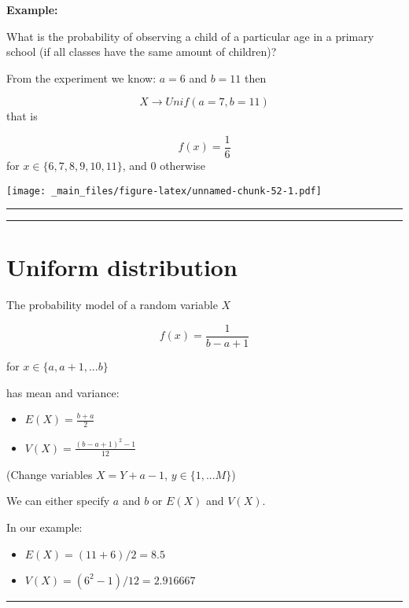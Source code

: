 \documentclass[
]{book}
\providecommand{\tightlist}{%
  \setlength{\itemsep}{0pt}\setlength{\parskip}{0pt}}
\begin{document}
\textbf{Example:}

What is the probability of observing a child of a particular age in a primary school (if all classes have the same amount of children)?

From the experiment we know: \(a=6\) and \(b=11\) then

\[X \rightarrow Unif(a=7, b=11)\] that is

\[f(x)=\frac{1}{6}\] for \(x\in \{6,7,8,9,10,11\}\), and \(0\) otherwise

\texttt{[image: \_main\_files/figure-latex/unnamed-chunk-52-1.pdf]}

\begin{center}\rule{0.5\linewidth}{0.5pt}\end{center}

\begin{center}\rule{0.5\linewidth}{0.5pt}\end{center}

\hypertarget{uniform-distribution-1}{%
\section{Uniform distribution}\label{uniform-distribution-1}}

The probability model of a random variable \(X\)

\[f(x)=\frac{1}{b-a+1}\]

for \(x \in \{a, a+1, ...b\}\)

has mean and variance:

\begin{itemize}
\item
  \(E(X)= \frac{b+a}{2}\)
\item
  \(V(X)= \frac{(b-a+1)^2-1}{12}\)
\end{itemize}

(Change variables \(X=Y+a-1\), \(y \in \{1,...M\}\))

We can either specify \(a\) and \(b\) or \(E(X)\) and \(V(X)\).

In our example:

\begin{itemize}
\tightlist
\item
  \(E(X)=(11+6)/2=8.5\)
\item
  \(V(X)=(6^2-1)/12=2.916667\)
\end{itemize}

\begin{center}\rule{0.5\linewidth}{0.5pt}\end{center}
\end{document}
